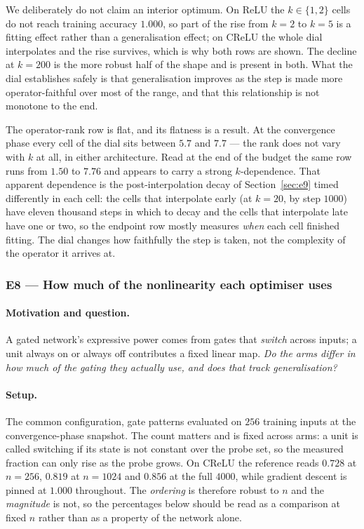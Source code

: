\documentclass{article} %
\theoremstyle{plain}
\theoremstyle{definition}
\theoremstyle{remark}
\begin{document}
We deliberately do not claim an interior optimum. On ReLU the $k \in \{1,2\}$ cells do not reach
training accuracy $1.000$, so part of the rise from $k=2$ to $k=5$ is a fitting effect rather than a
generalisation effect; on CReLU the whole dial interpolates and the rise survives, which is why both
rows are shown. The decline at $k=200$ is the more robust half of the shape and is present in both.
What the dial establishes safely is that generalisation improves as the step is made more
operator-faithful over most of the range, and that this relationship is not monotone to the end.

The operator-rank row is flat, and its flatness is a result. At the convergence phase every cell of
the dial sits between $5.7$ and $7.7$ --- the rank does not vary with $k$ at all, in either
architecture. Read at the end of the budget the same row runs from $1.50$ to $7.76$ and appears to
carry a strong $k$-dependence. That apparent dependence is the post-interpolation decay of
Section~\ref{sec:e9} timed differently in each cell: the cells that interpolate early (at $k=20$,
by step $1000$) have eleven thousand steps in which to decay and the cells that interpolate late
have one or two, so the endpoint row mostly measures \emph{when} each cell finished fitting. The
dial changes how faithfully the step is taken, not the complexity of the operator it arrives at.

\subsubsection{E8 --- How much of the nonlinearity each optimiser uses}
\label{sec:e8}

\paragraph{Motivation and question.}
A gated network's expressive power comes from gates that \emph{switch} across inputs; a unit always
on or always off contributes a fixed linear map. \emph{Do the arms differ in how much of the gating
they actually use, and does that track generalisation?}

\paragraph{Setup.} The common configuration, gate patterns evaluated on $256$ training inputs at
the convergence-phase snapshot. The count matters and is fixed across arms: a unit is called switching if its
state is not constant over the probe set, so the measured fraction can only rise as the probe
grows. On CReLU the reference reads $0.728$ at $n = 256$, $0.819$ at $n = 1024$ and $0.856$ at the
full $4000$, while gradient descent is pinned at $1.000$ throughout. The \emph{ordering} is
therefore robust to $n$ and the \emph{magnitude} is not, so the percentages below should be read
as a comparison at fixed $n$ rather than as a property of the network alone.
\end{document}
